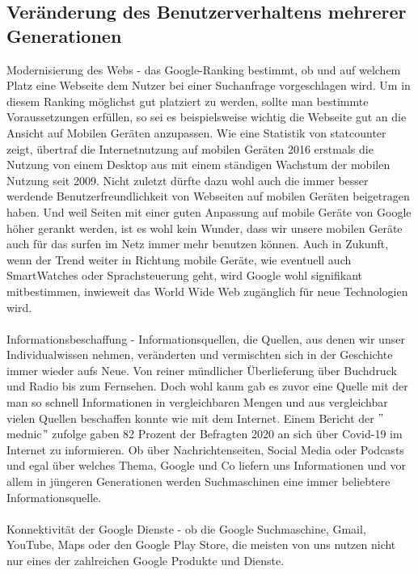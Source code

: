 \subsection{Veränderung des Benutzerverhaltens mehrerer Generationen}\label{subsec:veränderung-des-benutzerverhaltens-mehrerer-generationen}
Modernisierung des Webs - das Google-Ranking bestimmt, ob und auf welchem Platz eine Webseite dem Nutzer bei einer Suchanfrage vorgeschlagen wird.
Um in diesem Ranking möglichst gut platziert zu werden, sollte man bestimmte Voraussetzungen erfüllen, so sei es beispielsweise wichtig die Webseite gut an die Ansicht auf Mobilen Geräten anzupassen.\cite{BUI22}
Wie eine Statistik von statcounter zeigt, übertraf die Internetnutzung auf mobilen Geräten 2016 erstmals die Nutzung von einem Desktop aus mit einem ständigen Wachstum der mobilen Nutzung seit 2009.\cite{STA16}
Nicht zuletzt dürfte dazu wohl auch die immer besser werdende Benutzerfreundlichkeit von Webseiten auf mobilen Geräten beigetragen haben.
Und weil Seiten mit einer guten Anpassung auf mobile Geräte von Google höher gerankt werden, ist es wohl kein Wunder, dass wir unsere mobilen Geräte auch für das surfen im Netz immer mehr benutzen können.
Auch in Zukunft, wenn der Trend weiter in Richtung mobile Geräte, wie eventuell auch SmartWatches oder Sprachsteuerung geht,
wird Google wohl signifikant mitbestimmen, inwieweit das World Wide Web zugänglich für neue Technologien wird.
\\\\
Informationsbeschaffung - Informationsquellen, die Quellen, aus denen wir unser Individualwissen nehmen,
veränderten und vermischten sich in der Geschichte immer wieder aufs Neue.
Von reiner mündlicher Überlieferung über Buchdruck und Radio bis zum Fernsehen.
Doch wohl kaum gab es zuvor eine Quelle mit der man so schnell Informationen in vergleichbaren Mengen und aus vergleichbar vielen Quellen beschaffen konnte wie mit dem Internet.
Einem Bericht der \("\)mednic\("\) zufolge gaben 82 Prozent der Befragten 2020 an sich über Covid-19 im Internet zu informieren.\cite{RKW20}
Ob über Nachrichtenseiten, Social Media oder Podcasts und egal über welches Thema,
Google und Co liefern uns Informationen und vor allem in jüngeren Generationen werden Suchmaschinen eine immer beliebtere Informationsquelle.
\\\\
Konnektivität der Google Dienste - ob die Google Suchmaschine, Gmail, YouTube, Maps oder den Google Play Store,
die meisten von uns nutzen nicht nur eines der zahlreichen Google Produkte und Dienste.
